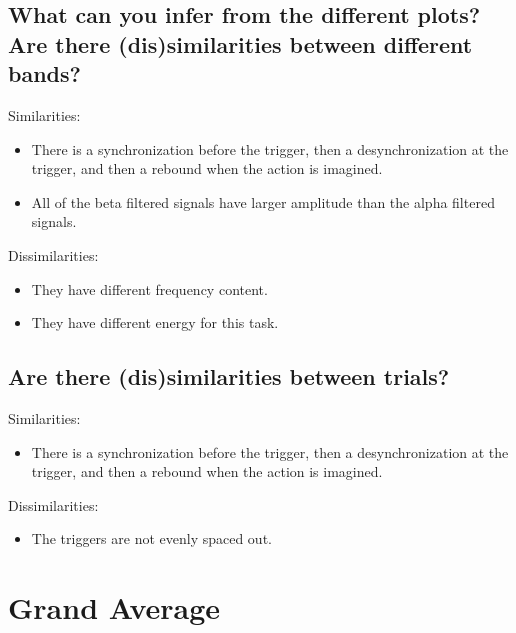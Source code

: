 \documentclass[12pt]{article}
\newcommand\tab[1][0.60cm]{\hspace*{#1}}
\begin{document}
\subsection{What can you infer from the different plots? Are there (dis)similarities between different bands?}
\tab Similarities:
\begin{itemize}
  \item There is a synchronization before the trigger, then a desynchronization at the trigger, and then a rebound when the action is imagined.
  \item All of the beta filtered signals have larger amplitude than the alpha filtered signals.
\end{itemize}

Dissimilarities:
\begin{itemize}
  \item They have different frequency content.
  \item They have different energy for this task.
\end{itemize}

\subsection{Are there (dis)similarities between trials?}
\tab Similarities:
\begin{itemize}
  \item There is a synchronization before the trigger, then a desynchronization at the trigger, and then a rebound when the action is imagined.
\end{itemize}

Dissimilarities:
\begin{itemize}
  \item The triggers are not evenly spaced out.
\end{itemize}\clearpage

\section{Grand Average}
\end{document}
